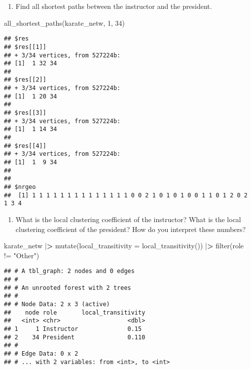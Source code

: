 \documentclass[
]{article}
\newenvironment{Shaded}{\begin{snugshade}}{\end{snugshade}}
\newcommand{\AttributeTok}[1]{\textcolor[rgb]{0.77,0.63,0.00}{#1}}
\newcommand{\DecValTok}[1]{\textcolor[rgb]{0.00,0.00,0.81}{#1}}
\newcommand{\ErrorTok}[1]{\textcolor[rgb]{0.64,0.00,0.00}{\textbf{#1}}}
\newcommand{\FunctionTok}[1]{\textcolor[rgb]{0.00,0.00,0.00}{#1}}
\newcommand{\NormalTok}[1]{#1}
\newcommand{\SpecialCharTok}[1]{\textcolor[rgb]{0.00,0.00,0.00}{#1}}
\newcommand{\StringTok}[1]{\textcolor[rgb]{0.31,0.60,0.02}{#1}}
\providecommand{\tightlist}{%
  \setlength{\itemsep}{0pt}\setlength{\parskip}{0pt}}
\begin{document}
\begin{enumerate}
\def\labelenumi{(\arabic{enumi})}
\setcounter{enumi}{5}
\tightlist
\item
  Find all shortest paths between the instructor and the president.
\end{enumerate}

\begin{Shaded}
\begin{Highlighting}[]
\FunctionTok{all\_shortest\_paths}\NormalTok{(karate\_netw, }\DecValTok{1}\NormalTok{, }\DecValTok{34}\NormalTok{)}
\end{Highlighting}
\end{Shaded}

\begin{verbatim}
## $res
## $res[[1]]
## + 3/34 vertices, from 527224b:
## [1]  1 32 34
## 
## $res[[2]]
## + 3/34 vertices, from 527224b:
## [1]  1 20 34
## 
## $res[[3]]
## + 3/34 vertices, from 527224b:
## [1]  1 14 34
## 
## $res[[4]]
## + 3/34 vertices, from 527224b:
## [1]  1  9 34
## 
## 
## $nrgeo
##  [1] 1 1 1 1 1 1 1 1 1 1 1 1 1 1 0 0 2 1 0 1 0 1 0 0 1 1 0 1 2 0 2 1 3 4
\end{verbatim}

\begin{enumerate}
\def\labelenumi{(\arabic{enumi})}
\setcounter{enumi}{6}
\tightlist
\item
  What is the local clustering coefficient of the instructor? What is
  the local clustering coefficient of the president? How do you
  interpret these numbers?
\end{enumerate}

\begin{Shaded}
\begin{Highlighting}[]
\NormalTok{  karate\_netw }\SpecialCharTok{|}\ErrorTok{\textgreater{}}
  \FunctionTok{mutate}\NormalTok{(}\AttributeTok{local\_transitivity =} \FunctionTok{local\_transitivity}\NormalTok{())  }\SpecialCharTok{|}\ErrorTok{\textgreater{}}
  \FunctionTok{filter}\NormalTok{(role }\SpecialCharTok{!=} \StringTok{"Other"}\NormalTok{) }
\end{Highlighting}
\end{Shaded}

\begin{verbatim}
## # A tbl_graph: 2 nodes and 0 edges
## #
## # An unrooted forest with 2 trees
## #
## # Node Data: 2 x 3 (active)
##    node role       local_transitivity
##   <int> <chr>                   <dbl>
## 1     1 Instructor              0.15 
## 2    34 President               0.110
## #
## # Edge Data: 0 x 2
## # ... with 2 variables: from <int>, to <int>
\end{verbatim}
\end{document}
